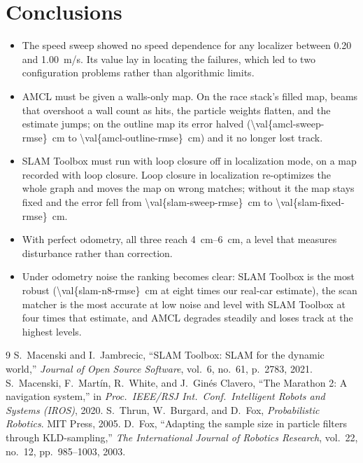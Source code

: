 \documentclass[11pt,letterpaper]{article}
\begin{document}
\FloatBarrier
\section{Conclusions}\label{sec:conclusions}

\begin{itemize}[leftmargin=1.5em]
  \item The speed sweep showed no speed dependence for any localizer between 0.20 and
        \SI{1.00}{m/s}. Its value lay in locating the failures, which led to two configuration
        problems rather than algorithmic limits.
  \item AMCL must be given a walls-only map. On the race stack's filled map, beams that overshoot a
        wall count as hits, the particle weights flatten, and the estimate jumps; on the outline map
        its error halved (\SI{\val{amcl-sweep-rmse}}{cm} to \SI{\val{amcl-outline-rmse}}{cm}) and it
        no longer lost track.
  \item SLAM Toolbox must run with loop closure off in localization mode, on a map recorded with
        loop closure. Loop closure in localization re-optimizes the whole graph and moves the map on
        wrong matches; without it the map stays fixed and the error fell from
        \SI{\val{slam-sweep-rmse}}{cm} to \SI{\val{slam-fixed-rmse}}{cm}.
  \item With perfect odometry, all three reach \SIrange{4}{6}{cm}, a level that measures disturbance
        rather than correction.
  \item Under odometry noise the ranking becomes clear: SLAM Toolbox is the most robust
        (\SI{\val{slam-n8-rmse}}{cm} at eight times our real-car estimate), the scan matcher is the most
        accurate at low noise and level with SLAM Toolbox at four times that estimate, and AMCL
        degrades steadily and loses track at the highest levels.
\end{itemize}

\begin{thebibliography}{9}\small
{}
S.~Macenski and I.~Jambrecic, ``SLAM Toolbox: SLAM for the dynamic world,'' \emph{Journal of Open
Source Software}, vol.~6, no.~61, p.~2783, 2021.
S.~Macenski, F.~Mart\'in, R.~White, and J.~Gin\'es Clavero, ``The Marathon 2: A navigation
system,'' in \emph{Proc.\ IEEE/RSJ Int.\ Conf.\ Intelligent Robots and Systems (IROS)}, 2020.
S.~Thrun, W.~Burgard, and D.~Fox, \emph{Probabilistic Robotics}. MIT Press, 2005.
D.~Fox, ``Adapting the sample size in particle filters through KLD-sampling,'' \emph{The
International Journal of Robotics Research}, vol.~22, no.~12, pp.~985--1003, 2003.
\end{thebibliography}
\end{document}
